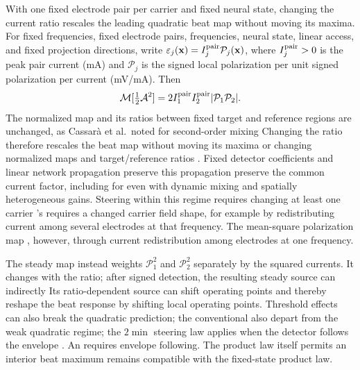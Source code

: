 \documentclass[11pt,a4paper]{article}
\providecommand{\DIFaddtex}[1]{{\protect\color{blue} \sf #1}} %
\providecommand{\DIFdeltex}[1]{{\protect\color{red} \scriptsize #1}} %
\providecommand{\DIFaddbegin}{} %
\providecommand{\DIFaddend}{} %
\providecommand{\DIFdelbegin}{} %
\providecommand{\DIFdelend}{} %
\providecommand{\DIFadd}[1]{\texorpdfstring{\DIFaddtex{#1}}{#1}} %
\providecommand{\DIFdel}[1]{\texorpdfstring{\DIFdeltex{#1}}{}} %
\begin{document}
With \DIFdelbegin \DIFdel{one fixed electrode pair per carrier and fixed neural state, changing the
current ratio rescales the leading quadratic beat map without moving its maxima.
For fixed frequencies, }\DIFdelend \DIFaddbegin \DIFadd{fixed electrode pairs, frequencies, neural state, }\DIFaddend linear access, and
\DIFdelbegin \DIFdel{fixed }\DIFdelend projection directions, write
$\varepsilon_j(\mathbf x)=I_j^{\rm pair}\mathcal P_j(\mathbf x)$,
where $I_j^{\rm pair}>0$ is \DIFdelbegin \DIFdel{the }\DIFdelend peak pair current (mA) and $\mathcal P_j$ is
\DIFdelbegin \DIFdel{the signed local polarization per unit }\DIFdelend \DIFaddbegin \DIFadd{signed polarization per }\DIFaddend current (mV/mA). Then
\[
\mathcal M[\tfrac12\mathcal A^2]
=2I_1^{\rm pair}I_2^{\rm pair}|\mathcal P_1\mathcal P_2|.
\]
\DIFdelbegin \DIFdel{The normalized map and its ratios between fixed target and reference regions are unchanged, as
Cassar\`a et al.\ noted for second-order mixing }\DIFdelend \DIFaddbegin \DIFadd{Changing the ratio therefore rescales the beat map without moving its maxima
or changing normalized maps and target/reference ratios
}\DIFaddend \cite{cassara2025part2}. Fixed detector coefficients and linear \DIFdelbegin \DIFdel{network propagation
preserve this }\DIFdelend \DIFaddbegin \DIFadd{propagation
preserve the }\DIFaddend common current factor, \DIFdelbegin \DIFdel{including for }\DIFdelend \DIFaddbegin \DIFadd{even with }\DIFaddend dynamic mixing and \DIFdelbegin \DIFdel{spatially }\DIFdelend heterogeneous
gains. Steering \DIFdelbegin \DIFdel{within this regime requires changing at least one carrier 's }\DIFdelend \DIFaddbegin \DIFadd{requires a changed carrier }\DIFaddend field shape, for example \DIFdelbegin \DIFdel{by redistributing current among several electrodes at that frequency.
The mean-square polarization map , however, }\DIFdelend \DIFaddbegin \DIFadd{through
current redistribution among electrodes at one frequency.
}

\DIFadd{The steady map instead }\DIFaddend weights $\mathcal P_1^2$ and $\mathcal P_2^2$ \DIFdelbegin \DIFdel{separately }\DIFdelend by
the squared currents. \DIFdelbegin \DIFdel{It changes with the ratio;
after signed detection, the resulting steady source can indirectly }\DIFdelend \DIFaddbegin \DIFadd{Its ratio-dependent source can shift operating points
and thereby }\DIFaddend reshape the beat response\DIFdelbegin \DIFdel{by shifting local operating points}\DIFdelend . Threshold effects \DIFdelbegin \DIFdel{can also break the quadratic prediction; the conventional }\DIFdelend \DIFaddbegin \DIFadd{also depart from
the weak quadratic regime; the }\DIFaddend $2\min$ steering law \DIFdelbegin \DIFdel{applies
when the detector follows the envelope
. An }\DIFdelend \DIFaddbegin \DIFadd{requires envelope
following. The product law itself permits an }\DIFaddend interior beat maximum\DIFdelbegin \DIFdel{remains
compatible with the fixed-state product law.
}%
\end{document}
